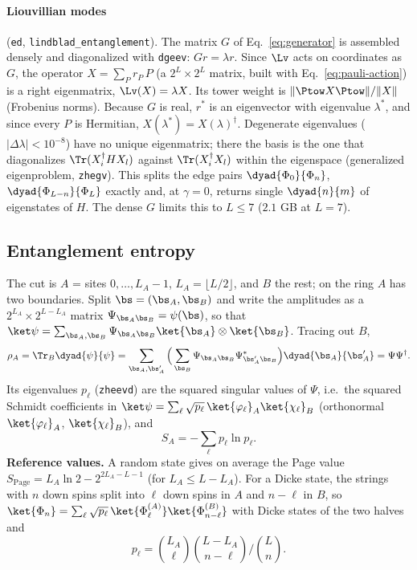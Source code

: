 \paragraph{Liouvillian modes} (\texttt{ed}, \texttt{lindblad\_entanglement}). The matrix $G$ of Eq.~\eqref{eq:generator} is assembled densely and diagonalized with \texttt{dgeev}: $Gr = \lambda r$. Since $\Lv$ acts on coordinates as $G$, the operator $X = \sum_P r_P\,P$ (a $2^L\times2^L$ matrix, built with Eq.~\eqref{eq:pauli-action}) is a right eigenmatrix, $\Lv(X) = \lambda X$. Its tower weight is $\lVert\Ptow X\Ptow\rVert/\lVert X\rVert$ (Frobenius norms). Because $G$ is real, $r^*$ is an eigenvector with eigenvalue $\lambda^*$, and since every $P$ is Hermitian, $X(\lambda^*) = X(\lambda)^\dagger$. Degenerate eigenvalues ($\lvert\Delta\lambda\rvert < 10^{-8}$) have no unique eigenmatrix; there the basis is the one that diagonalizes $\Tr(X_i^\dagger HX_l)$ against $\Tr(X_i^\dagger X_l)$ within the eigenspace (generalized eigenproblem, \texttt{zhegv}). This splits the edge pairs $\dyad{\Phi_0}{\Phi_n}$, $\dyad{\Phi_{L-n}}{\Phi_L}$ exactly and, at $\gamma = 0$, returns single $\dyad{n}{m}$ of eigenstates of $H$. The dense $G$ limits this to $L \le 7$ ($2.1$ GB at $L = 7$).

\subsection{Entanglement entropy}

The cut is $A$ = sites $0, \dots, L_A - 1$, $L_A = \lfloor L/2\rfloor$, and $B$ the rest; on the ring $A$ has two boundaries. Split $\bs = (\bs_A, \bs_B)$ and write the amplitudes as a $2^{L_A}\times2^{L-L_A}$ matrix $\Psi_{\bs_A\bs_B} = \psi(\bs)$, so that $\ket\psi = \sum_{\bs_A,\bs_B}\Psi_{\bs_A\bs_B}\ket{\bs_A}\otimes\ket{\bs_B}$. Tracing out $B$,
\begin{equation}
\rho_A = \Tr_B\dyad{\psi}{\psi} = \sum_{\bs_A,\bs_A'}\Big(\sum_{\bs_B}\Psi_{\bs_A\bs_B}\Psi^*_{\bs_A'\bs_B}\Big)\dyad{\bs_A}{\bs_A'} = \Psi\Psi^\dagger .
\end{equation}
Its eigenvalues $p_\ell$ (\texttt{zheevd}) are the squared singular values of $\Psi$, i.e.\ the squared Schmidt coefficients in $\ket\psi = \sum_\ell\sqrt{p_\ell}\,\ket{\varphi_\ell}_A\ket{\chi_\ell}_B$ (orthonormal $\ket{\varphi_\ell}_A$, $\ket{\chi_\ell}_B$), and
\begin{equation}
S_A = -\sum_\ell p_\ell\ln p_\ell .
\end{equation}
\textbf{Reference values.} A random state gives on average the Page value $S_{\mathrm{Page}} = L_A\ln2 - 2^{2L_A - L - 1}$ (for $L_A \le L - L_A$). For a Dicke state, the strings with $n$ down spins split into $\ell$ down spins in $A$ and $n - \ell$ in $B$, so $\ket{\Phi_n} = \sum_\ell\sqrt{p_\ell}\,\ket{\Phi^{(A)}_\ell}\ket{\Phi^{(B)}_{n-\ell}}$ with Dicke states of the two halves and
\begin{equation}
p_\ell = \binom{L_A}{\ell}\binom{L - L_A}{n - \ell}\Big/\binom{L}{n}.
\end{equation}

